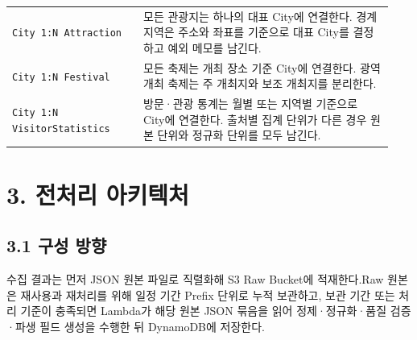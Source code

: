 \documentclass[12pt,a4paper]{article}
\newcommand{\DocNeedspace}[1]{\par\ifdim\dimexpr\pagegoal-\pagetotal\relax<#1\newpage\fi}
\begin{document}
\DocNeedspace{12\baselineskip}
\begin{small}
\begin{longtable}{@{}>{\RaggedRight\arraybackslash}m{0.327\linewidth}>{\RaggedRight\arraybackslash}m{0.613\linewidth}@{}}
\toprule
\multicolumn{1}{>{\centering\arraybackslash}m{0.327\linewidth}}{\textbf{관계}} & \multicolumn{1}{>{\centering\arraybackslash}m{0.613\linewidth}}{\textbf{전처리 기준}} \\
\midrule
\endhead
\texttt{City 1:\allowbreak{}N Attraction} & 모든 관광지는 하나의 대표 City에 연결한다. 경계 지역은 주소와 좌표를 기준으로 대표 City를 결정하고 예외 메모를 남긴다. \\
\texttt{City 1:\allowbreak{}N Festival} & 모든 축제는 개최 장소 기준 City에 연결한다. 광역 개최 축제는 주 개최지와 보조 개최지를 분리한다. \\
\texttt{City 1:\allowbreak{}N VisitorStatistics} & 방문·관광 통계는 월별 또는 지역별 기준으로 City에 연결한다. 출처별 집계 단위가 다른 경우 원본 단위와 정규화 단위를 모두 남긴다. \\
\bottomrule
\end{longtable}
\end{small}


\newpage

\DocNeedspace{10\baselineskip}
\section*{3. 전처리 아키텍처}


\DocNeedspace{8\baselineskip}
\subsection*{3.1 구성 방향}


\DocNeedspace{3\baselineskip}
수집 결과는 먼저 JSON 원본 파일로 직렬화해 S3 Raw Bucket에 적재한다.\newline Raw 원본은 재사용과 재처리를 위해 일정 기간 Prefix 단위로 누적 보관하고, 보관 기간 또는 처리 기준이 충족되면 Lambda가 해당 원본 JSON 묶음을 읽어 정제·정규화·품질 검증·파생 필드 생성을 수행한 뒤 DynamoDB에 저장한다.
\end{document}

